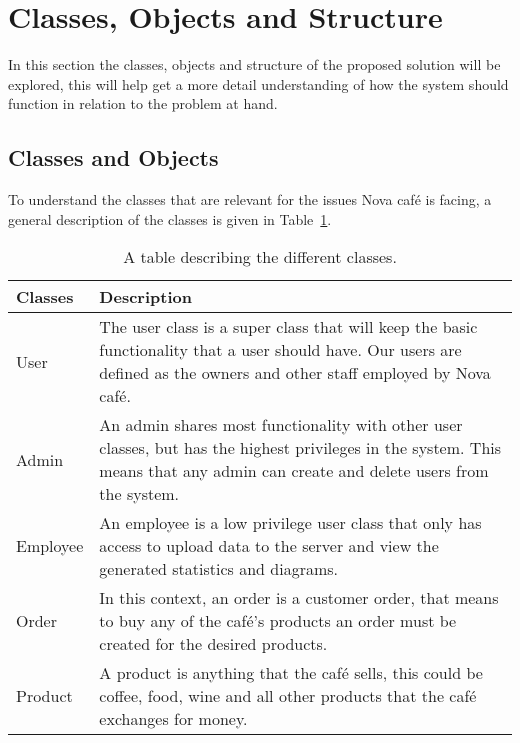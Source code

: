 \section{Classes, Objects and Structure}\label{sec:classes-objects-and-structure}

In this section the classes, objects and structure of the proposed solution will be explored, this
will help get a more detail understanding of how the system should function in relation to the problem at hand.

\subsection{Classes and Objects}\label{subsec:classes-and-objects}

To understand the classes that are relevant for the issues Nova café is facing,
a general description of the classes is given in Table~\ref{tab:class-table}.

\begin{table}[H]
    \centering
    \begin{tabular} { m{2.5cm} m{10cm} }
        \toprule
        \textbf{Classes} & \textbf{Description} \\
        \midrule
        User & The user class is a super class that will keep the
        basic functionality that a user should have.
        Our users are defined as the owners and other staff employed by Nova café. \\
        \midrule
        Admin & An admin shares most functionality with other user classes,
        but has the highest privileges in the system.
        This means that any admin can create and delete users from the system. \\
        \midrule
        Employee & An employee is a low privilege user class
        that only has access to upload data to the server and
        view the generated statistics and diagrams. \\
        \midrule
        Order & In this context, an order is a customer order,
        that means to buy any of the café's products an order must be created
        for the desired products. \\
        \midrule
        Product & A product is anything that the café sells,
        this could be coffee, food, wine and all other products that
        the café exchanges for money. \\
        \bottomrule
    \end{tabular}
    \caption{A table describing the different classes.}\label{tab:class-table}
\end{table}

